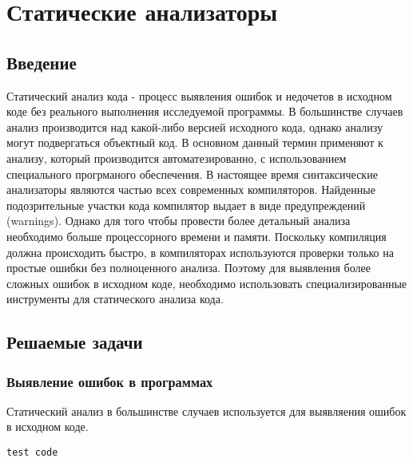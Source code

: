 \chapter{Статические анализаторы}

\section{Введение}

Статический анализ кода - процесс выявления ошибок и недочетов в исходном коде без реального выполнения 
исследуемой программы. В большинстве случаев анализ производится над какой-либо версией исходного кода,
однако анализу могут подвергаться объектный код. В основном данный термин применяют к анализу,
который производится автоматезированно, с использованием специального прогрманого обеспечения.
В настоящее время синтаксические анализаторы являются частью всех современных компиляторов. 
Найденные подозрительные участки кода компилятор выдает в виде предупреждений (warnings). 
Однако для того чтобы провести более детальный анализа необходимо больше процессорного времени и памяти. 
Поскольку компиляция должна происходить быстро, в компиляторах используются проверки только
на простые ошибки без полноценного анализа. Поэтому для выявления более сложных ошибок в исходном коде, 
необходимо использовать специализированные инструменты для статического анализа кода.


\section{Решаемые задачи}

\subsection {Выявление ошибок в программах}
Статический анализ в большинстве случаев используется для выявляения ошибок в исходном коде.
\begin{lstlisting}
test code
\end{lstlisting}
 

